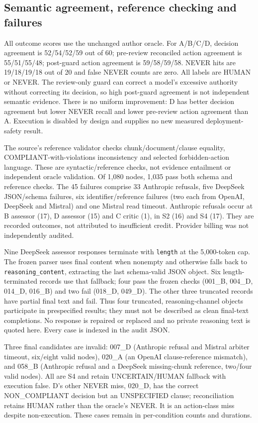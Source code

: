\begin{revision}
\subsection{Semantic agreement, reference checking and failures}
All outcome scores use the unchanged author oracle. For A/B/C/D, decision
agreement is 52/54/52/59 out of 60; pre-review reconciled action agreement
is 55/51/55/48; post-guard action agreement is 59/58/59/58. NEVER hits are
19/18/19/18 out of 20 and false NEVER counts are zero. All labels are HUMAN
or NEVER. The review-only guard can correct a model's excessive authority
without correcting its decision, so high post-guard agreement is not
independent semantic evidence. There is no uniform improvement: D has
better decision agreement but lower NEVER recall and lower pre-review
action agreement than A. Execution is disabled by design and supplies no
new measured deployment-safety result.




The source's reference validator checks chunk/document/clause equality,
COMPLIANT-with-violations inconsistency and selected forbidden-action
language. These are syntactic/reference checks, not evidence entailment or
independent oracle validation. Of 1,080 nodes, 1,035 pass both schema and
reference checks. The 45 failures comprise 33 Anthropic refusals, five
DeepSeek JSON/schema failures, six identifier/reference failures (two each
from OpenAI, DeepSeek and Mistral) and one Mistral read timeout. Anthropic
refusals occur at B assessor (17), D assessor (15) and C critic (1), in S2
(16) and S4 (17). They are recorded outcomes, not attributed to insufficient
credit. Provider billing was not independently audited.

Nine DeepSeek assessor responses terminate with \texttt{length} at the
5,000-token cap. The frozen parser uses final content when nonempty and
otherwise falls back to \texttt{reasoning\_content}, extracting the last
schema-valid JSON object. Six length-terminated records use that fallback;
four pass the frozen checks (001\_B, 004\_D, 014\_D, 016\_B) and two fail
(018\_D, 049\_D). The other three truncated records have partial final text
and fail. Thus four truncated, reasoning-channel objects participate in
prespecified results; they must not be described as clean final-text
completions. No response is repaired or replaced and no private reasoning
text is quoted here. Every case is indexed in the audit JSON.

Three final candidates are invalid: 007\_D (Anthropic refusal and Mistral
arbiter timeout, six/eight valid nodes), 020\_A (an OpenAI clause-reference
mismatch), and 058\_B (Anthropic refusal and a DeepSeek missing-chunk
reference, two/four valid nodes). All are S4 and retain UNCERTAIN/HUMAN
fallback with execution false. D's other NEVER miss, 020\_D, has the correct
NON\_COMPLIANT decision but an UNSPECIFIED clause; reconciliation retains
HUMAN rather than the oracle's NEVER. It is an action-class miss despite
non-execution. These cases remain in per-condition counts and durations.


\end{revision}
